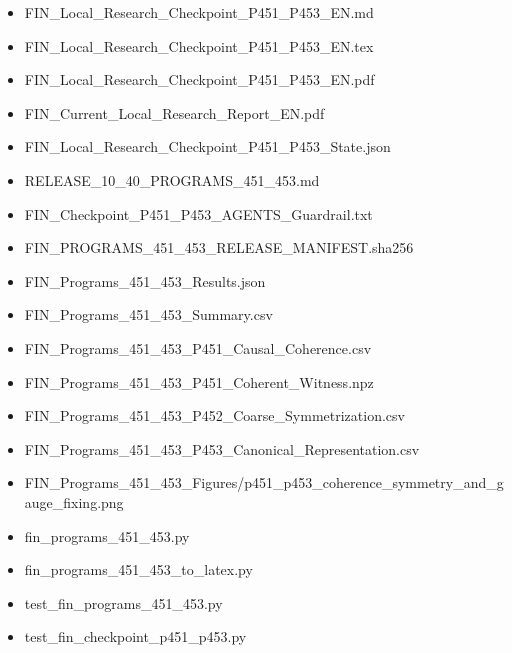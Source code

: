 \documentclass[11pt,a4paper,openany]{report}
\begin{document}
\begin{itemize}
\item 
FIN\_Local\_Research\_Checkpoint\_P451\_P453\_EN.md

\item 
FIN\_Local\_Research\_Checkpoint\_P451\_P453\_EN.tex

\item 
FIN\_Local\_Research\_Checkpoint\_P451\_P453\_EN.pdf

\item 
FIN\_Current\_Local\_Research\_Report\_EN.pdf

\item 
FIN\_Local\_Research\_Checkpoint\_P451\_P453\_State.json

\item 
RELEASE\_10\_40\_PROGRAMS\_451\_453.md

\item 
FIN\_Checkpoint\_P451\_P453\_AGENTS\_Guardrail.txt

\item 
FIN\_PROGRAMS\_451\_453\_RELEASE\_MANIFEST.sha256

\item 
FIN\_Programs\_451\_453\_Results.json

\item 
FIN\_Programs\_451\_453\_Summary.csv

\item 
FIN\_Programs\_451\_453\_P451\_Causal\_Coherence.csv

\item 
FIN\_Programs\_451\_453\_P451\_Coherent\_Witness.npz

\item 
FIN\_Programs\_451\_453\_P452\_Coarse\_Symmetrization.csv

\item 
FIN\_Programs\_451\_453\_P453\_Canonical\_Representation.csv

\item 
FIN\_Programs\_451\_453\_Figures/\allowbreak{}p451\_p453\_coherence\_symmetry\_and\_gauge\_fixing.png

\item 
fin\_programs\_451\_453.py

\item 
fin\_programs\_451\_453\_to\_latex.py

\item 
test\_fin\_programs\_451\_453.py

\item 
test\_fin\_checkpoint\_p451\_p453.py

\end{itemize}
\end{document}

